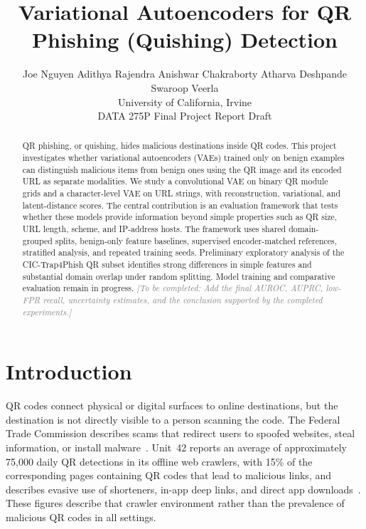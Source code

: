 \documentclass{article}
\title{Variational Autoencoders for QR Phishing (Quishing) Detection}
\author{%
  Joe Nguyen \And
  Adithya Rajendra \And
  Anishwar Chakraborty \And
  Atharva Deshpande \And
  Swaroop Veerla \\
  University of California, Irvine \\
  DATA 275P Final Project Report Draft \\
}
\newcommand{\pending}[1]{\textcolor{gray}{\textit{[To be completed: #1]}}}
\begin{document}
\maketitle

\begin{abstract}
QR phishing, or quishing, hides malicious destinations inside QR codes.
This project investigates whether variational autoencoders (VAEs) trained only on benign examples can distinguish malicious items from benign ones using the QR image and its encoded URL as separate modalities.
We study a convolutional VAE on binary QR module grids and a character-level VAE on URL strings, with reconstruction, variational, and latent-distance scores.
The central contribution is an evaluation framework that tests whether these models provide information beyond simple properties such as QR size, URL length, scheme, and IP-address hosts.
The framework uses shared domain-grouped splits, benign-only feature baselines, supervised encoder-matched references, stratified analysis, and repeated training seeds.
Preliminary exploratory analysis of the CIC-Trap4Phish QR subset identifies strong differences in simple features and substantial domain overlap under random splitting.
Model training and comparative evaluation remain in progress.
\pending{Add the final AUROC, AUPRC, low-FPR recall, uncertainty estimates, and the conclusion supported by the completed experiments.}
\end{abstract}

\section{Introduction}

QR codes connect physical or digital surfaces to online destinations, but the destination is not directly visible to a person scanning the code.
The Federal Trade Commission describes scams that redirect users to spoofed websites, steal information, or install malware~\citep{puig}.
Unit~42 reports an average of approximately 75{,}000 daily QR detections in its offline web crawlers, with 15\% of the corresponding pages containing QR codes that lead to malicious links, and describes evasive use of shorteners, in-app deep links, and direct app downloads~\citep{marty}.
These figures describe that crawler environment rather than the prevalence of malicious QR codes in all settings.
\end{document}
